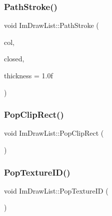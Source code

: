 \hypertarget{struct_im_draw_list_ac3172e376a4b77915bb22b6d8092b8b2}{}\label{struct_im_draw_list_ac3172e376a4b77915bb22b6d8092b8b2} 
\subsubsection{\texorpdfstring{Path\+Stroke()}{PathStroke()}}
{\footnotesize\ttfamily void Im\+Draw\+List\+::\+Path\+Stroke (\begin{DoxyParamCaption}\item[{Im\+U32}]{col,  }\item[{bool}]{closed,  }\item[{float}]{thickness = {\ttfamily 1.0f} }\end{DoxyParamCaption})}

\hypertarget{struct_im_draw_list_a44f40c59ca755f559020f5a7fa81103a}{}\label{struct_im_draw_list_a44f40c59ca755f559020f5a7fa81103a} 
\subsubsection{\texorpdfstring{Pop\+Clip\+Rect()}{PopClipRect()}}
{\footnotesize\ttfamily void Im\+Draw\+List\+::\+Pop\+Clip\+Rect (\begin{DoxyParamCaption}{ }\end{DoxyParamCaption})}

\hypertarget{struct_im_draw_list_ade9286c5ca58753f7bd571b30e2ff76c}{}\label{struct_im_draw_list_ade9286c5ca58753f7bd571b30e2ff76c} 
\subsubsection{\texorpdfstring{Pop\+Texture\+I\+D()}{PopTextureID()}}
{\footnotesize\ttfamily void Im\+Draw\+List\+::\+Pop\+Texture\+ID (\begin{DoxyParamCaption}{ }\end{DoxyParamCaption})}

\hypertarget{struct_im_draw_list_a9df27414aaca5f34ac3664a8b82582b5}{}\label{struct_im_draw_list_a9df27414aaca5f34ac3664a8b82582b5} 
